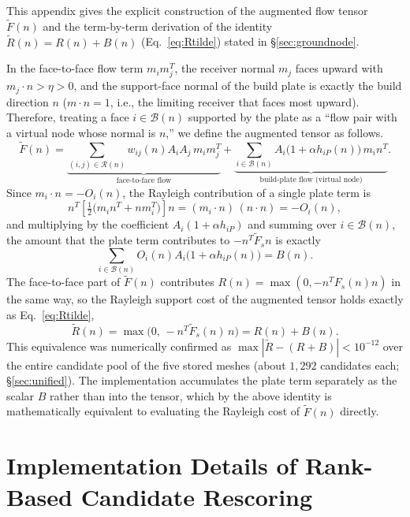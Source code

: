 \documentclass[11pt,a4paper]{article}
\begin{document}
This appendix gives the explicit construction of the augmented flow tensor $\tilde F(n)$ and the term-by-term
derivation of the identity $\tilde R(n)=R(n)+B(n)$ (Eq.~\eqref{eq:Rtilde}) stated in \S\ref{sec:groundnode}.

In the face-to-face flow term $m_im_j^T$, the receiver normal $m_j$ faces upward with $m_j\cdot n>\eta>0$,
and the support-face normal of the build plate is exactly the build direction $n$
($m\cdot n=1$, i.e., the limiting receiver that faces most upward).
Therefore, treating a face $i\in\mathcal{B}(n)$ supported by the plate as a ``flow pair with a virtual node whose normal is $n$,''
we define the augmented tensor as follows.
\begin{equation}
\tilde F(n)
=
\underbrace{\sum_{(i,j)\in\mathcal{R}(n)} w_{ij}(n)A_iA_j\,m_im_j^T}_{\text{face-to-face flow}}
+
\underbrace{\sum_{i\in\mathcal{B}(n)} A_i\big(1+\alpha h_{iP}(n)\big)\,m_in^T}_{\text{build-plate flow (virtual node)}}.
\label{eq:Ftilde}
\end{equation}
Since $m_i\cdot n=-O_i(n)$, the Rayleigh contribution of a single plate term is
\begin{equation}
n^T\!\left[\tfrac{1}{2}\big(m_in^T+nm_i^T\big)\right]\!n
= (m_i\cdot n)\,(n\cdot n) = -O_i(n),
\end{equation}
and multiplying by the coefficient $A_i(1+\alpha h_{iP})$ and summing over $i\in\mathcal{B}(n)$,
the amount that the plate term contributes to $-n^T\tilde F_s n$ is exactly
\begin{equation}
\sum_{i\in\mathcal{B}(n)} O_i(n)A_i\big(1+\alpha h_{iP}(n)\big) = B(n).
\end{equation}
The face-to-face part of $\tilde F(n)$ contributes $R(n)=\max(0,-n^TF_s(n)n)$ in the same way,
so the Rayleigh support cost of the augmented tensor holds exactly as Eq.~\eqref{eq:Rtilde},
\begin{equation*}
\tilde R(n)
=
\max\!\big(0,\,-n^T\tilde F_s(n)\,n\big)
=
R(n)+B(n).
\end{equation*}
This equivalence was numerically confirmed as $\max|\tilde R-(R+B)|<10^{-12}$ over the entire candidate pool
of the five stored meshes (about $1{,}292$ candidates each; \S\ref{sec:unified}).
The implementation accumulates the plate term separately as the scalar $B$ rather than into the tensor,
which by the above identity is mathematically equivalent to evaluating the Rayleigh cost of $\tilde F(n)$ directly.

\section{Implementation Details of Rank-Based Candidate Rescoring}
\label{sec:appendix-ranktuning}
\end{document}
